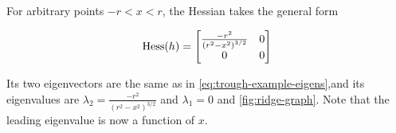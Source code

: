 For arbitrary points $-r < x < r$, the Hessian takes the general form

\begin{equation}
\mathrm{Hess}(h) =
  \begin{bmatrix} \frac{-r^2}{\left(r^2 - x^2\right)^{3/2}} & 0 \\
                  0 & 0 \end{bmatrix}
\end{equation}

Its two eigenvectors are the same as in \cref{eq:trough-example-eigens},and its eigenvalues are $\lambda_2 = \frac{-r^2}{\left(r^2 - x^2\right)^{3/2}}$ and $\lambda_1 = 0$ and \cref{fig:ridge-graph}. Note that the leading eigenvalue is now a function of $x$.

